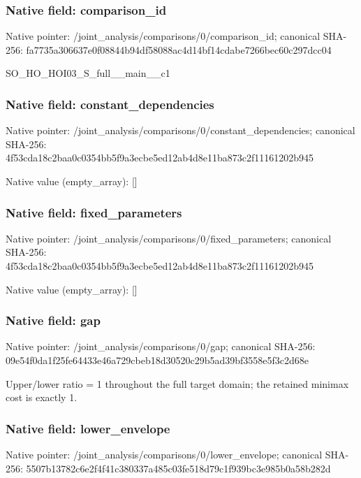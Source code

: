 \documentclass[10pt,a4paper]{article}
\begin{document}
\subsubsection{Native field: comparison\_\allowbreak{}id}
Native pointer: /joint\_\allowbreak{}analysis/comparisons/0/comparison\_\allowbreak{}id; canonical SHA-256: fa7735a306637e0f08844b94df58088ac4d14bf14cdabe7266bec60c297dcc04

\begingroup\raggedright\sloppy SO\_\allowbreak{}HO\_\allowbreak{}HOI03\_\allowbreak{}S\_\allowbreak{}full\_\allowbreak{}\_\allowbreak{}main\_\allowbreak{}\_\allowbreak{}c1\par\endgroup

\subsubsection{Native field: constant\_\allowbreak{}dependencies}
Native pointer: /joint\_\allowbreak{}analysis/comparisons/0/constant\_\allowbreak{}dependencies; canonical SHA-256: 4f53cda18c2baa0c0354bb5f9a3ecbe5ed12ab4d8e11ba873c2f11161202b945

Native value (empty\_\allowbreak{}array): []

\subsubsection{Native field: fixed\_\allowbreak{}parameters}
Native pointer: /joint\_\allowbreak{}analysis/comparisons/0/fixed\_\allowbreak{}parameters; canonical SHA-256: 4f53cda18c2baa0c0354bb5f9a3ecbe5ed12ab4d8e11ba873c2f11161202b945

Native value (empty\_\allowbreak{}array): []

\subsubsection{Native field: gap}
Native pointer: /joint\_\allowbreak{}analysis/comparisons/0/gap; canonical SHA-256: 09e54f0da1f25fe64433e46a729cbeb18d30520c29b5ad39bf3558e5f3c2d68e

\begingroup\raggedright\sloppy Upper/\allowbreak{}lower ratio =\allowbreak{} 1 throughout the full target domain;\allowbreak{} the retained minimax cost is exactly 1.\par\endgroup

\subsubsection{Native field: lower\_\allowbreak{}envelope}
Native pointer: /joint\_\allowbreak{}analysis/comparisons/0/lower\_\allowbreak{}envelope; canonical SHA-256: 5507b13782c6e2f4f41c380337a485c03fe518d79c1f939bc3e985b0a58b282d
\end{document}
